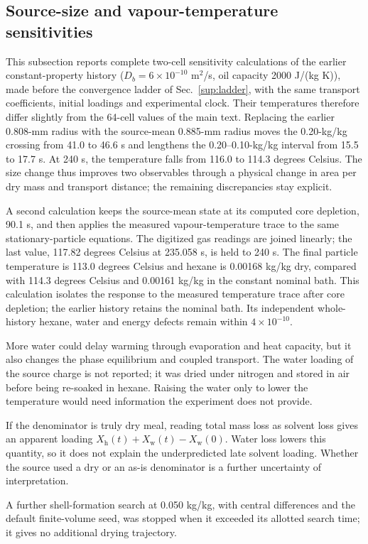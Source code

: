 \documentclass[11pt]{article}
\begin{document}
\subsection{Source-size and vapour-temperature sensitivities}
\label{sup:fanerassumptions}
This subsection reports complete two-cell sensitivity calculations of the
earlier constant-property history ($D_b=6\times10^{-10}$ m$^2$/s, oil
capacity 2000 J/(kg K)), made before the convergence ladder of
Sec.~\ref{sup:ladder}, with the same transport coefficients, initial
loadings and experimental clock. Their temperatures therefore differ
slightly from the 64-cell values of the main text.
Replacing the earlier 0.808-mm radius with the source-mean
0.885-mm radius moves the 0.20-kg/kg crossing from 41.0 to 46.6 s and
lengthens the 0.20--0.10-kg/kg interval from 15.5 to 17.7 s. At 240 s,
the temperature falls from 116.0 to 114.3 degrees Celsius. The size change
thus improves two observables through a physical change in area per dry
mass and transport distance; the remaining discrepancies stay explicit.

A second calculation keeps the source-mean state at its computed core
depletion, 90.1 s, and then applies the measured vapour-temperature trace
to the same stationary-particle equations. The digitized gas readings are
joined linearly; the last value, 117.82 degrees
Celsius at 235.058 s, is held to 240 s. The final particle temperature is
113.0 degrees Celsius and hexane is 0.00168 kg/kg dry, compared with
114.3 degrees Celsius and 0.00161 kg/kg in the constant nominal bath.
This calculation isolates the response to the measured temperature
trace after core depletion; the earlier history retains the nominal bath. Its independent whole-history
hexane, water and energy defects remain within $4\times10^{-10}$.

More water could delay warming through evaporation and heat capacity, but
it also changes the phase equilibrium and coupled transport. The water
loading of the source charge is not reported; it was dried under nitrogen
and stored in air before being re-soaked in hexane. Raising the water only to lower the temperature would need
information the experiment does not provide.
\par
If the denominator is truly dry meal, reading total mass loss as solvent
loss gives an apparent loading $X_{\mathrm h}(t)+X_{\mathrm w}(t)
-X_{\mathrm w}(0)$. Water loss lowers this quantity, so it does not
explain the underpredicted late solvent loading. Whether the source used a
dry or an as-is denominator is a further uncertainty of interpretation.
\par
A further shell-formation search at 0.050 kg/kg, with central differences
and the default finite-volume seed, was stopped when it exceeded its
allotted search time; it gives no additional drying trajectory.
\end{document}
